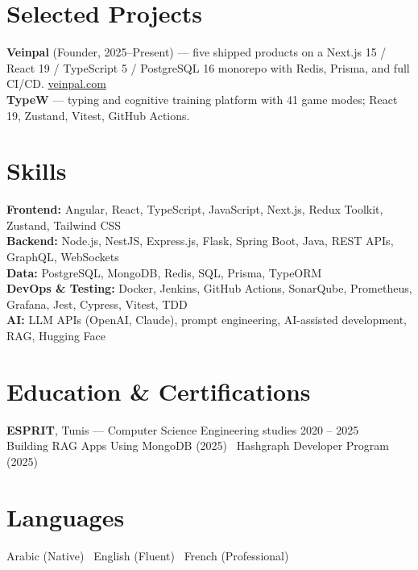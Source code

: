 \documentclass[10pt,a4paper]{article}
\begin{document}
\section*{Selected Projects}
{\small
\textbf{Veinpal} (Founder, 2025--Present) --- five shipped products on a Next.js 15 /
React 19 / TypeScript 5 / PostgreSQL 16 monorepo with Redis, Prisma, and full CI/CD.
\href{https://veinpal.com/apps}{veinpal.com}\\[2pt]
\textbf{TypeW} --- typing and cognitive training platform with 41 game modes;
React 19, Zustand, Vitest, GitHub Actions.
}

\section*{Skills}
{\small
\textbf{Frontend:} Angular, React, TypeScript, JavaScript, Next.js, Redux Toolkit, Zustand, Tailwind CSS\\
\textbf{Backend:} Node.js, NestJS, Express.js, Flask, Spring Boot, Java, REST APIs, GraphQL, WebSockets\\
\textbf{Data:} PostgreSQL, MongoDB, Redis, SQL, Prisma, TypeORM\\
\textbf{DevOps \& Testing:} Docker, Jenkins, GitHub Actions, SonarQube, Prometheus, Grafana, Jest, Cypress, Vitest, TDD\\
\textbf{AI:} LLM APIs (OpenAI, Claude), prompt engineering, AI-assisted development, RAG, Hugging Face
}

\section*{Education \& Certifications}
{\small
\textbf{ESPRIT}, Tunis --- Computer Science Engineering studies \hfill 2020 -- 2025\\[1pt]
Building RAG Apps Using MongoDB (2025) \textperiodcentered\ Hashgraph Developer Program (2025)
}

\section*{Languages}
{\small Arabic (Native) \textperiodcentered\ English (Fluent) \textperiodcentered\ French (Professional)}
\end{document}
